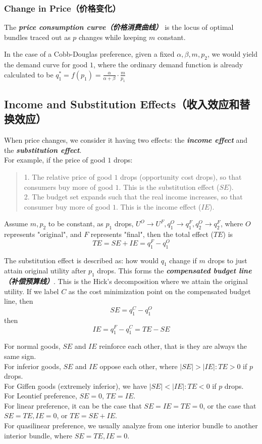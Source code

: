 \subsubsection{Change in Price（价格变化）}
\begin{definition}
    The \textbf{\textit{price consumption curve（价格消费曲线）}} is the locus of optimal bundles traced out as $p$ changes while keeping $m$ constant.
\end{definition}
In the case of a Cobb-Douglas preference, given a fixed $\alpha, \beta, m, p_2$, we would yield the demand curve for good $1$, where the ordinary demand function is already calculated to be $q_1^{*} = f(p_1) = \frac{\alpha}{\alpha + \beta} \cdot \frac{m}{p_1}$

\subsection{Income and Substitution Effects（收入效应和替换效应）}
When price changes, we consider it having two effects: the \textbf{\textit{income effect}} and the \textbf{\textit{substitution effect}}. \\
For example, if the price of good $1$ drops:
\begin{quote}
    1. The relative price of good $1$ drops (opportunity cost drops), so that consumers buy more of good $1$. This is the substitution effect ($SE$). \\
    2. The budget set expands such that the real income increases, so that consumer buy more of good $1$. This is the income effect ($IE$).
\end{quote}
Assume $m, p_2$ to be constant, as $p_1$ drops, $U^O \to U^F, q_1^O \to q_1^F, q_2^O \to q_2^F$, where $O$ represents "original", and $F$ represents "final", then the total effect ($TE$) is
$$TE = SE + IE = q_1^F - q_1^O$$

The substitution effect is described as: how would $q_1$ change if $m$ drops to just attain original utility after $p_1$ drops. This forms the \textbf{\textit{compensated budget line（补偿预算线）}}. This is the Hick's decomposition where we attain the original utility. If we label $C$ as the cost minimization point on the compensated budget line, then
$$SE = q_1^C - q_1^O$$
then
$$IE = q_1^F - q_1^C = TE - SE$$

For normal goods, $SE$ and $IE$ reinforce each other, that is they are always the same sign. \\
For inferior goods, $SE$ and $IE$ oppose each other, where $|SE| > |IE|: TE > 0$ if $p$ drops. \\
For Giffen goods (extremely inferior), we have $|SE| < |IE|: TE < 0$ if $p$ drops. \\
For Leontief preference, $SE = 0$, $TE = IE$. \\
For linear preference, it can be the case that $SE = IE = TE = 0$, or the case that $SE = TE, IE = 0$, or $TE = SE + IE$. \\
For quasilinear preference, we usually analyze from one interior bundle to another interior bundle, where $SE = TE, IE = 0$.

